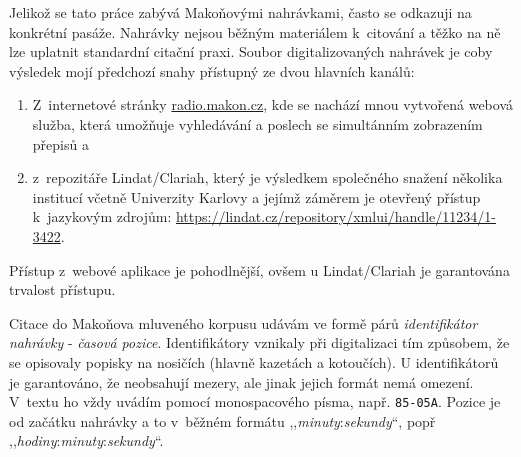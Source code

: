 Jelikož se tato práce zabývá Makoňovými nahrávkami, často se odkazuji na
konkrétní pasáže. Nahrávky nejsou běžným materiálem k~citování a těžko na ně lze
uplatnit standardní citační praxi. Soubor digitalizovaných nahrávek je coby
výsledek mojí předchozí snahy přístupný ze dvou hlavních kanálů:
\begin{enumerate}
\item{
  Z~internetové stránky \url{radio.makon.cz}, kde se nachází mnou vytvořená
  webová služba, která umožňuje vyhledávání a poslech se simultánním zobrazením
  přepisů a
}
\item{
  z~repozitáře Lindat/Clariah, který je výsledkem společného snažení několika
  institucí včetně Univerzity Karlovy a jejímž záměrem je otevřený přístup
  k~jazykovým zdrojům: \url{https://lindat.cz/repository/xmlui/handle/11234/1-3422}.
}
\end{enumerate}
Přístup z~webové aplikace je pohodlnější, ovšem u Lindat/Clariah je garantována
trvalost přístupu.

Citace do Makoňova mluveného korpusu udávám ve formě párů \textit{identifikátor
nahrávky} - \textit{časová pozice}. Identifikátory vznikaly při digitalizaci tím
způsobem, že se opisovaly popisky na nosičích (hlavně kazetách a kotoučích). U
identifikátorů je garantováno, že neobsahují mezery, ale jinak jejich formát
nemá omezení. V~textu ho vždy uvádím pomocí monospacového písma, např.
\texttt{85-05A}. Pozice je od začátku nahrávky a to v~běžném formátu
,,\textit{minuty}:\textit{sekundy}``, popř
,,\textit{hodiny}:\textit{minuty}:\textit{sekundy}``.
